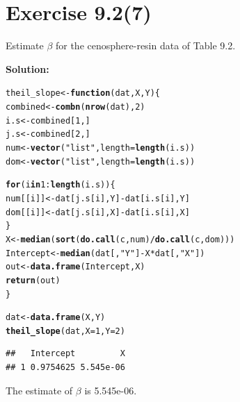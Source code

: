 \documentclass[a4paper]{article}\usepackage[]{graphicx}\usepackage[]{color}
\makeatletter
\newcommand{\hlnum}[1]{\textcolor[rgb]{0.686,0.059,0.569}{#1}}%
\newcommand{\hlstr}[1]{\textcolor[rgb]{0.192,0.494,0.8}{#1}}%
\newcommand{\hlopt}[1]{\textcolor[rgb]{0,0,0}{#1}}%
\newcommand{\hlstd}[1]{\textcolor[rgb]{0.345,0.345,0.345}{#1}}%
\newcommand{\hlkwa}[1]{\textcolor[rgb]{0.161,0.373,0.58}{\textbf{#1}}}%
\newcommand{\hlkwb}[1]{\textcolor[rgb]{0.69,0.353,0.396}{#1}}%
\newcommand{\hlkwc}[1]{\textcolor[rgb]{0.333,0.667,0.333}{#1}}%
\newcommand{\hlkwd}[1]{\textcolor[rgb]{0.737,0.353,0.396}{\textbf{#1}}}%
\newenvironment{kframe}{%
 \def\at@end@of@kframe{}%
 \ifinner\ifhmode%
  \def\at@end@of@kframe{\end{minipage}}%
  \begin{minipage}{\columnwidth}%
 \fi\fi%
 \def\FrameCommand##1{\hskip\@totalleftmargin \hskip-\fboxsep
 \colorbox{shadecolor}{##1}\hskip-\fboxsep
     \hskip-\linewidth \hskip-\@totalleftmargin \hskip\columnwidth}%
 \MakeFramed {\advance\hsize-\width
   \@totalleftmargin\z@ \linewidth\hsize
   \@setminipage}}%
 {\par\unskip\endMakeFramed%
 \at@end@of@kframe}
\newenvironment{knitrout}{}{} %
\makeatother
\begin{document}
\section{ Exercise 9.2(7)}

Estimate $\beta$ for the cenosphere-resin data of Table 9.2.\\

\vspace{2 mm}

\raggedright{\textbf{Solution:}}\\

\begin{knitrout}
\color{fgcolor}\begin{kframe}
\begin{alltt}
\hlstd{theil_slope} \hlkwb{<-}\hlkwa{function}\hlstd{(}\hlkwc{dat}\hlstd{,} \hlkwc{X}\hlstd{,} \hlkwc{Y}\hlstd{)\{}
  \hlstd{combined} \hlkwb{<-} \hlkwd{combn}\hlstd{(}\hlkwd{nrow}\hlstd{(dat),} \hlnum{2}\hlstd{)}
  \hlstd{i.s} \hlkwb{<-} \hlstd{combined[}\hlnum{1}\hlstd{,]}
  \hlstd{j.s} \hlkwb{<-} \hlstd{combined[}\hlnum{2}\hlstd{,]}
  \hlstd{num} \hlkwb{<-} \hlkwd{vector}\hlstd{(}\hlstr{"list"}\hlstd{,} \hlkwc{length}\hlstd{=}\hlkwd{length}\hlstd{(i.s))}
  \hlstd{dom} \hlkwb{<-} \hlkwd{vector}\hlstd{(}\hlstr{"list"}\hlstd{,} \hlkwc{length}\hlstd{=}\hlkwd{length}\hlstd{(i.s))}

  \hlkwa{for}\hlstd{(i} \hlkwa{in} \hlnum{1}\hlopt{:}\hlkwd{length}\hlstd{(i.s))\{}
    \hlstd{num[[i]]}  \hlkwb{<-} \hlstd{dat[j.s[i],Y]} \hlopt{-} \hlstd{dat[i.s[i],Y]}
    \hlstd{dom[[i]]}  \hlkwb{<-} \hlstd{dat[j.s[i],X]} \hlopt{-} \hlstd{dat[i.s[i],X]}
  \hlstd{\}}
  \hlstd{X} \hlkwb{<-} \hlkwd{median}\hlstd{(} \hlkwd{sort}\hlstd{(} \hlkwd{do.call}\hlstd{(c, num)} \hlopt{/} \hlkwd{do.call}\hlstd{(c, dom) ) )}
  \hlstd{Intercept} \hlkwb{<-} \hlkwd{median}\hlstd{(dat[,}\hlstr{"Y"}\hlstd{]} \hlopt{-} \hlstd{X}\hlopt{*}\hlstd{dat[,}\hlstr{"X"}\hlstd{])}
  \hlstd{out} \hlkwb{<-} \hlkwd{data.frame}\hlstd{(Intercept, X)}
  \hlkwd{return}\hlstd{(out)}
\hlstd{\}}

\hlstd{dat} \hlkwb{<-} \hlkwd{data.frame}\hlstd{(X,Y)}
\hlkwd{theil_slope}\hlstd{(dat,} \hlkwc{X}\hlstd{=}\hlnum{1}\hlstd{,} \hlkwc{Y}\hlstd{=}\hlnum{2}\hlstd{)}
\end{alltt}
\begin{verbatim}
##   Intercept         X
## 1 0.9754625 5.545e-06
\end{verbatim}
\end{kframe}
\end{knitrout}
\raggedright{The estimate of $\beta$ is 5.545e-06.}\\
\end{document}
